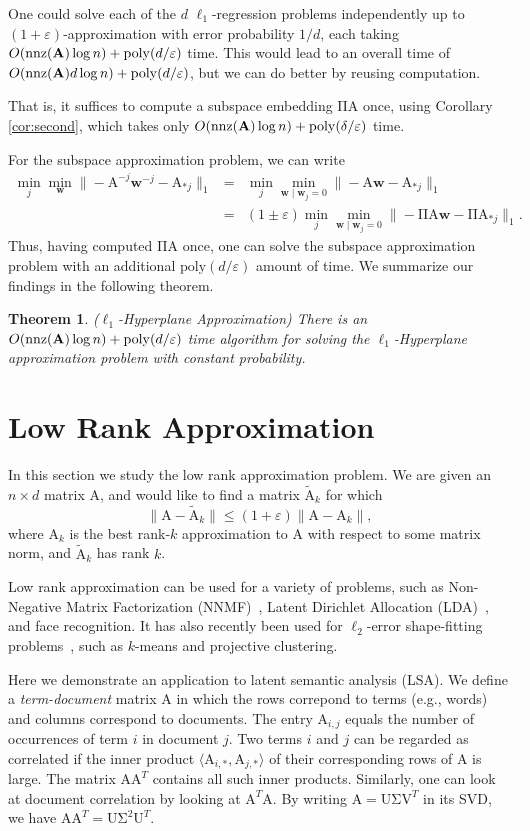 \documentclass[11pt]{article}
\newtheorem{theorem}{Theorem}
\newcommand{\mat}[1]{{\ensuremath{\bm{\mathrm{#1}}}}}
\def\d{{\mathbf \delta}}
\def\matA{\mat{A}}
\def\matU{\mat{U}}
\def\matV{\mat{V}}
\def\w{{\mathbf{w}}}
\def\nnz{{ \rm nnz }}
\newcommand{\eps}{\varepsilon}
\newcommand{\poly}{{\mathrm{poly}}}
\begin{document}
One could solve each of the $d$ $\ell_1$-regression problems independently up to $(1+\eps)$-approximation with error
probability $1/d$, each taking $O(\nnz(\matA)\log n) + \poly(d/\eps)$ time. This would lead to
an overall time of $O(\nnz(\matA) d \log n) + \poly(d/\eps)$, but we can do better by reusing computation. 

That is, it suffices to compute a subspace embedding $\mat\Pi \matA$ once, using Corollary \ref{cor:second}, which
takes only $O(\nnz(\matA) \log n) + \poly(\d/\eps)$ time. 

For the subspace approximation problem, we can write
\begin{eqnarray*}
\min_j \min_{\w} \|-\matA^{-j} \w^{-j} -\matA_{*j}\|_1
& = & \min_j \min_{\w \mid \w_j = 0} \|-\matA \w - \matA_{*j}\|_1\\
& = & (1 \pm \eps) \min_j \min_{\w \mid \w_j = 0} \|-\mat\Pi \matA \w- \mat\Pi \matA_{*j}\|_1.
\end{eqnarray*}
Thus, having computed $\mat\Pi \matA$ once, one can solve the subspace approximation problem with an
additional $\poly(d/\eps)$ amount of time. We summarize our findings in the following theorem. 

\begin{theorem}($\ell_1$-Hyperplane Approximation)
There is an $O(\nnz(\matA)\log n) + \poly(d/\eps)$ time algorithm for solving the $\ell_1$-Hyperplane
approximation problem with constant probability. 
\end{theorem}

\section{Low Rank Approximation}\label{chap:lowRank}
In this section we study the low rank approximation problem. We are given
an $n \times d$ matrix $\matA$, and would like to find a matrix $\tilde{\matA}_k$
for which 
$$\|\matA-\tilde{\matA}_k\| \leq (1+\eps) \|\matA-\matA_k\|,$$
where $\matA_k$ is the best rank-$k$ approximation to $\matA$ with respect to some
matrix norm, and $\tilde{\matA}_k$ has rank $k$. 

Low rank approximation can be used for a variety of problems, such as
Non-Negative Matrix Factorization (NNMF)~\cite{seung2001algorithms}, 
Latent Dirichlet Allocation (LDA)~\cite{blei2003latent}, and face recognition. 
It has also recently been used for $\ell_2$-error shape-fitting
problems~\cite{dan2013tiny}, such as $k$-means and projective clustering. 

Here we demonstrate an application to latent semantic analysis (LSA). We define a {\it term-document}
matrix $\matA$ in which the rows correpond to terms (e.g., words) and columns correspond to documents. The entry
$\matA_{i,j}$ equals the number of occurrences of term $i$ in document $j$. Two terms $i$ and $j$ can be regarded 
as correlated
if the inner product $\langle \matA_{i,*},\mat A_{j,*} \rangle$ of their corresponding rows of $\matA$ is large. The matrix
$\matA\matA^T$ contains all such inner products. Similarly, one can look at document correlation by looking at $\matA^T\matA$.
By writing $\matA = \matU \mat\Sigma \matV^T$ in its SVD, we have $\matA\matA^T = \matU\mat\Sigma^2 \matU^T$. 
\end{document}
